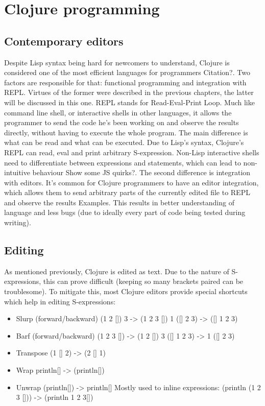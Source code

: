 \documentclass[11pt]{scrartcl}
\begin{document}
\section{Clojure programming}
\subsection{Contemporary editors}
Despite Lisp syntax being hard for newcomers to understand, Clojure is considered one of the most efficient languages for programmers {Citation?}. Two factors are responsible for that: functional programming and integration with REPL. Virtues of the former were described in the previous chapters, the latter will be discussed in this one. REPL stands for Read-Eval-Print Loop. Much like command line shell, or interactive shells in other languages, it allows the programmer to send the code he’s been working on and observe the results directly, without having to execute the whole program. The main difference is what can be read and what can be executed. Due to Lisp’s syntax, Clojure’s REPL can read, eval and print arbitrary S-expression. Non-Lisp interactive shells need to differentiate between expressions and statements, which can lead to non-intuitive behaviour {Show some JS quirks?}. The second difference is integration with editors. It’s common for Clojure programmers to have an editor integration, which allows them to send arbitrary parts of the currently edited file to REPL and observe the results {Examples}. This results in better understanding of language and less bugs (due to ideally every part of code being tested during writing).

\subsection{Editing}
As mentioned previously, Clojure is edited as text. Due to the nature of S-expressions, this can prove difficult (keeping so many brackets paired can be troublesome). To mitigate this, most Clojure editors provide special shortcuts which help in editing S-expressions:
\begin{itemize}
  \item Slurp (forward/backward)
(1 2 []) 3 -> (1 2 3 [])
1 ([] 2 3) -> ([] 1 2 3)
  \item Barf (forward/backward)
(1 2 3 []) -> (1 2 []) 3
([] 1 2 3) -> 1 ([] 2 3)
  \item  Transpose
(1 [] 2) -> (2 [] 1)
  \item Wrap
println[] -> (println[])
  \item Unwrap
(println[]) -> println[]
Mostly used to inline expressions:
(println (1 2 3 [])) -> (println 1 2 3[])
\end{itemize}
\end{document}
